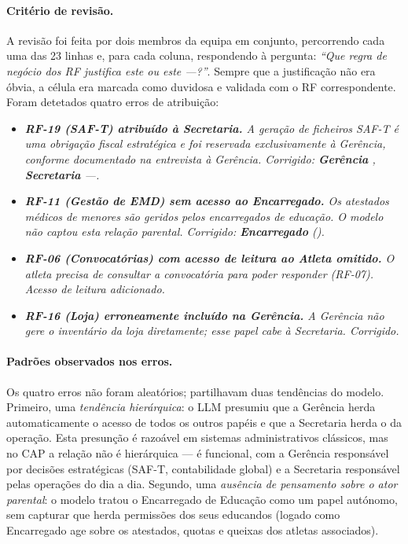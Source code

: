 \paragraph{Critério de revisão.}
A revisão foi feita por dois membros da equipa em conjunto, percorrendo cada uma das 23 linhas e, para cada coluna, respondendo à pergunta: \emph{``Que regra de negócio dos RF justifica este \checkmark{} ou este ---?''}. Sempre que a justificação não era óbvia, a célula era marcada como duvidosa e validada com o RF correspondente. Foram detetados quatro erros de atribuição:
\begin{itemize}
    \item \textit{\textbf{RF-19 (SAF-T) atribuído à Secretaria.} A geração de ficheiros SAF-T é uma obrigação fiscal estratégica e foi reservada exclusivamente à Gerência, conforme documentado na entrevista à Gerência. Corrigido: \textbf{Gerência} \checkmark, \textbf{Secretaria} ---.}
    \item \textit{\textbf{RF-11 (Gestão de EMD) sem acesso ao Encarregado.} Os atestados médicos de menores são geridos pelos encarregados de educação. O modelo não captou esta relação parental. Corrigido: \textbf{Encarregado} (\checkmark).}
    \item \textit{\textbf{RF-06 (Convocatórias) com acesso de leitura ao Atleta omitido.} O atleta precisa de consultar a convocatória para poder responder (RF-07). Acesso de leitura adicionado.}
    \item \textit{\textbf{RF-16 (Loja) erroneamente incluído na Gerência.} A Gerência não gere o inventário da loja diretamente; esse papel cabe à Secretaria. Corrigido.}
\end{itemize}

\paragraph{Padrões observados nos erros.}
Os quatro erros não foram aleatórios; partilhavam duas tendências do modelo. Primeiro, uma \emph{tendência hierárquica}: o LLM presumiu que a Gerência herda automaticamente o acesso de todos os outros papéis e que a Secretaria herda o da operação. Esta presunção é razoável em sistemas administrativos clássicos, mas no CAP a relação não é hierárquica --- é funcional, com a Gerência responsável por decisões estratégicas (SAF-T, contabilidade global) e a Secretaria responsável pelas operações do dia a dia. Segundo, uma \emph{ausência de pensamento sobre o ator parental}: o modelo tratou o Encarregado de Educação como um papel autónomo, sem capturar que herda permissões dos seus educandos (logado como Encarregado age sobre os atestados, quotas e queixas dos atletas associados).

